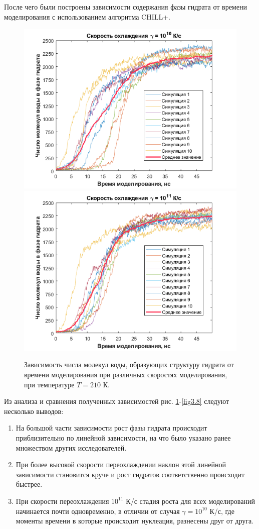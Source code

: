 После чего были построены зависимости содержания фазы гидрата от времени моделирования с использованием алгоритма CHILL+.

\begin{figure}[H]
    \centering
    \begin{minipage}{\linewidth}
        \includegraphics[width=.49\linewidth]{figures/bulk10.png}
        \includegraphics[width=.49\linewidth]{figures/bulk11.png}
    \end{minipage}
    \caption{Зависимость числа молекул воды, образующих структуру гидрата от времени моделирования при различных скоростях моделирования, при температуре $T=210$ К.}
    \label{fig3.7}
\end{figure}

Из анализа и сравнения полученных зависимостей рис. \ref{fig3.7}-\ref{fig3.8} следуют несколько выводов:
\begin{enumerate}
    \item На большой части зависимости рост фазы гидрата происходит приблизительно по линейной зависимости, на что было указано ранее множеством других исследователей.
    \item При более высокой скорости переохлаждении наклон этой линейной зависимости становится круче и рост гидратов соответственно происходит быстрее.
    \item При скорости переохлаждения $10^{11}$ К/с стадия роста для всех моделирований начинается почти одновременно, в отличии от случая $\gamma=10^10$ К/с, где моменты времени в которые происходит нуклеация, разнесены друг от друга.
\end{enumerate}

